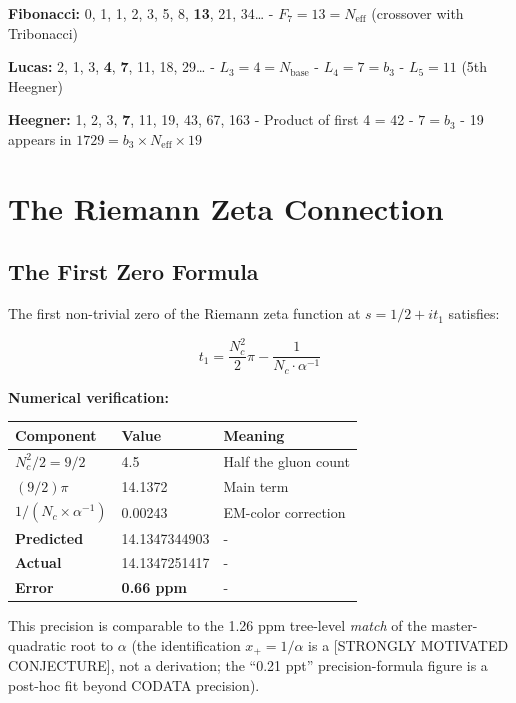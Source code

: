\documentclass[
  11pt,
  letterpaper,
  twoside,
  openright]{book}
\begin{document}
\textbf{Fibonacci:} 0, 1, 1, 2, 3, 5, 8, \textbf{13}, 21, 34\ldots{} -
\(F_7 = 13 = N_{\text{eff}}\) (crossover with Tribonacci)

\textbf{Lucas:} 2, 1, 3, \textbf{4}, \textbf{7}, 11, 18, 29\ldots{} -
\(L_3 = 4 = N_{\text{base}}\) - \(L_4 = 7 = b_3\) - \(L_5 = 11\) (5th
Heegner)

\textbf{Heegner:} 1, 2, 3, \textbf{7}, 11, 19, 43, 67, 163 - Product of
first 4 = 42 - \(7 = b_3\) - 19 appears in
\(1729 = b_3 \times N_{\text{eff}} \times 19\)

\section{The Riemann Zeta Connection}\label{the-riemann-zeta-connection}

\subsection{The First Zero Formula}\label{the-first-zero-formula}

The first non-trivial zero of the Riemann zeta function at
\(s = 1/2 + it_1\) satisfies:

\[t_1 = \frac{N_c^2}{2}\pi - \frac{1}{N_c \cdot \alpha^{-1}}\]

\textbf{Numerical verification:}

\begin{longtable}[]{@{}lll@{}}
\toprule\noalign{}
Component & Value & Meaning \\
\midrule\noalign{}
\endhead
\bottomrule\noalign{}
\endlastfoot
\(N_c^2/2 = 9/2\) & 4.5 & Half the gluon count \\
\((9/2)\pi\) & 14.1372 & Main term \\
\(1/(N_c \times \alpha^{-1})\) & 0.00243 & EM-color correction \\
\textbf{Predicted} & 14.1347344903 & - \\
\textbf{Actual} & 14.1347251417 & - \\
\textbf{Error} & \textbf{0.66 ppm} & - \\
\end{longtable}

This precision is comparable to the 1.26 ppm tree-level \emph{match} of
the master-quadratic root to \(\alpha\) (the identification
\(x_+=1/\alpha\) is a {[}STRONGLY MOTIVATED CONJECTURE{]}, not a
derivation; the ``0.21 ppt'' precision-formula figure is a post-hoc fit
beyond CODATA precision).
\end{document}
